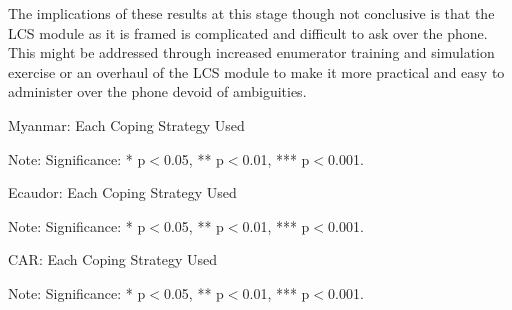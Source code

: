 \documentclass[11pt,harvard]{article}
\begin{document}
The implications of these results at this stage though not conclusive is that the LCS module as it is framed is complicated and difficult to ask over the phone. This might be addressed through increased enumerator training and simulation exercise or an overhaul of the LCS module to make it more practical and easy to administer over the phone devoid of ambiguities.  


\begin{table}[htbp]
	\centering
	\begin{adjustbox}{max width=\textwidth}
		\begin{threeparttable}
			\caption{Myanmar: Each Coping Strategy Used}
			\scriptsize
			 
			\label{tab:LCS_Ind_Modality_Myanmar}
			\begin{tablenotes}
				\item Note: Significance: * p$<$0.05, ** p$<$0.01, *** p$<$0.001. 
			\end{tablenotes}
		\end{threeparttable}
	\end{adjustbox}
\end{table}


\begin{table}[htbp]
	\centering
	\begin{adjustbox}{max width=\textwidth}
		\begin{threeparttable}
			\caption{Ecaudor: Each Coping Strategy Used}
			\scriptsize
			 
			\label{tab:LCS_Ind_Modality_Ecuador}
			\begin{tablenotes}
				\item Note: Significance: * p$<$0.05, ** p$<$0.01, *** p$<$0.001. 
			\end{tablenotes}
		\end{threeparttable}
	\end{adjustbox}
	
	
\end{table}
\begin{table}[htbp]
	\centering
	\begin{adjustbox}{max width=\textwidth}
		\begin{threeparttable}
			\caption{CAR: Each Coping Strategy Used}
			\scriptsize
			 
			\label{tab:LCS_Ind_Modality_CAR}
			\begin{tablenotes}
				\item Note: Significance: * p$<$0.05, ** p$<$0.01, *** p$<$0.001. 
			\end{tablenotes}
		\end{threeparttable}
	\end{adjustbox}
\end{table}
\end{document}
